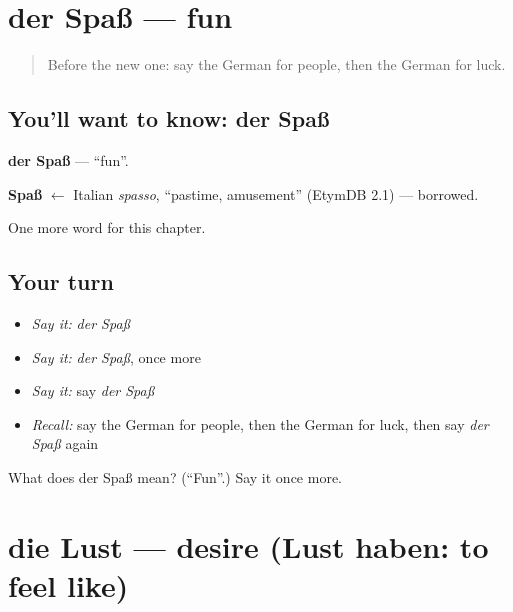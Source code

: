 \section[der Spaß]{der Spaß — fun}

\label{lesson:GE-C165-spass}



\begin{quote}
Before the new one: say the German for people, then the German for luck.
\end{quote}

\subsection*{You'll want to know: der Spaß}
\textbf{der Spaß} — \textquotedblleft{}fun\textquotedblright{}.

\begin{cousinweb}
\textbf{Spaß} $\leftarrow$ Italian \emph{spasso}, \textquotedblleft{}pastime, amusement\textquotedblright{} (EtymDB 2.1) — borrowed.
\end{cousinweb}

\begin{grammarlens}[title={What you've built}]
One more word for this chapter.
\end{grammarlens}

\subsection*{Your turn}
\begin{itemize}
\raggedright
  \item \emph{Say it:} \emph{der Spaß}
  \item \emph{Say it:} \emph{der Spaß}, once more
  \item \emph{Say it:} say \emph{der Spaß}
  \item \emph{Recall:} say the German for people, then the German for luck, then say \emph{der Spaß} again
\end{itemize}

\begin{tcolorbox}[breakable,colback=teal!4,colframe=teal!35!black,title={Before you move on}]
What does der Spaß mean? (\textquotedblleft{}Fun\textquotedblright{}.) Say it once more.
\end{tcolorbox}
\section[die Lust]{die Lust — desire (Lust haben: to feel like)}

